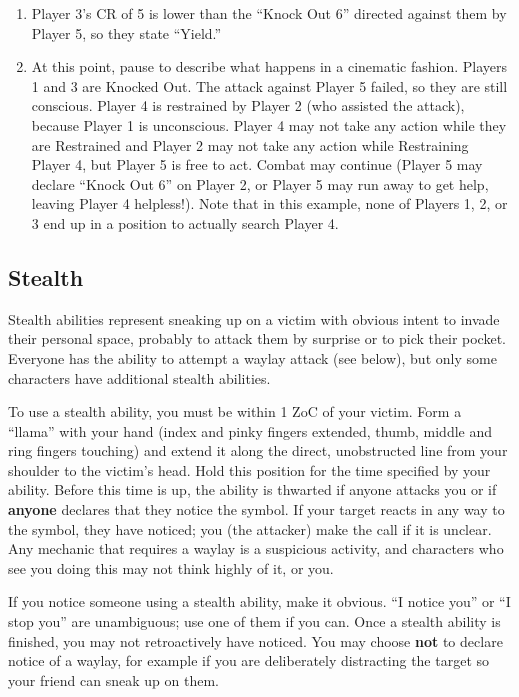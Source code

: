 \documentclass[sheet]{GL2020}
\begin{document}
\begin{enumerate}
	\item Player 3's CR of 5 is lower than the ``Knock Out 6'' directed against them by Player 5, so they state ``Yield.''
	\item At this point, pause to describe what happens in a cinematic fashion. Players 1 and 3 are Knocked Out. The attack against Player 5 failed, so they are still conscious. Player 4 is restrained by Player 2 (who assisted the attack), because Player 1 is unconscious. Player 4 may not take any action while they are Restrained and Player 2 may not take any action while Restraining Player 4, but Player 5 is free to act. Combat may continue (Player 5 may declare ``Knock Out 6'' on Player 2, or Player 5 may run away to get help, leaving Player 4 helpless!). Note that in this example, none of Players 1, 2, or 3 end up in a position to actually search Player 4.
\end{enumerate}

\subsection{Stealth}

Stealth abilities represent sneaking up on a victim with obvious intent to invade their personal space, probably to attack them by surprise or to pick their pocket. Everyone has the ability to attempt a waylay attack (see below), but only some characters have additional stealth abilities.

To use a stealth ability, you must be within 1 ZoC of your victim. Form a ``llama'' with your hand (index and pinky fingers extended, thumb, middle and ring fingers touching) and extend it along the direct, unobstructed line from your shoulder to the victim's head. Hold this position for the time specified by your ability. Before this time is up, the ability is thwarted if anyone attacks you or if \textbf{anyone} declares that they notice the symbol. If your target reacts in any way to the symbol, they have noticed; you (the attacker) make the call if it is unclear. Any mechanic that requires a waylay is a suspicious activity, and characters who see you doing this may not think highly of it, or you.

If you notice someone using a stealth ability, make it obvious. ``I notice you'' or “I stop you” are unambiguous; use one of them if you can. Once a stealth ability is finished, you may not retroactively have noticed. You may choose \textbf{not} to declare notice of a waylay, for example if you are deliberately distracting the target so your friend can sneak up on them. 
\end{document}
